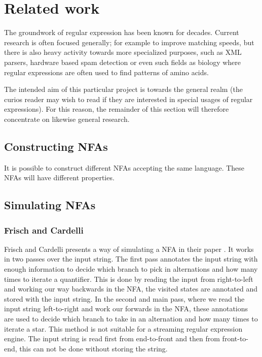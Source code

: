 \section{Related work}
\label{sec:related}

The groundwork of regular expression has been known for
decades. Current research is often focused generally; for
example to improve matching speeds, but there is also heavy activity
towards more specialized purposes, such as XML parsers, hardware based spam
detection or even such fields as biology where regular expressions are
often used to find patterns of amino acids. 

The intended aim of this particular project is towards the general
realm (the curios reader may wish to read  if they
are interested in special usages of regular expressions). For this
reason, the remainder of this section will therefore concentrate on
likewise general research.



\subsection{Constructing NFAs}

It is possible to construct different NFAs accepting the same
language. These NFAs will have different properties. 


\subsection{Simulating NFAs}

\subsubsection{Frisch and Cardelli}

Frisch and Cardelli presents a way of simulating a NFA in their paper
\cite{2004:GreedyRegularExpressionMatching}. It works in two passes
over the input string. The first pass annotates the input string with
enough information to decide which branch to pick in alternations and
how many times to iterate a quantifier. This is done by reading the
input from right-to-left and working our way backwards in the NFA, the
visited states are annotated and stored with the input string. In the
second and main pass, where we read the input string left-to-right and
work our forwards in the NFA, these annotations are used to decide
which branch to take in an alternation and how many times to iterate a
star. This method is not suitable for a streaming regular expression
engine. The input string is read first from end-to-front and then from
front-to-end, this can not be done without storing the string.

